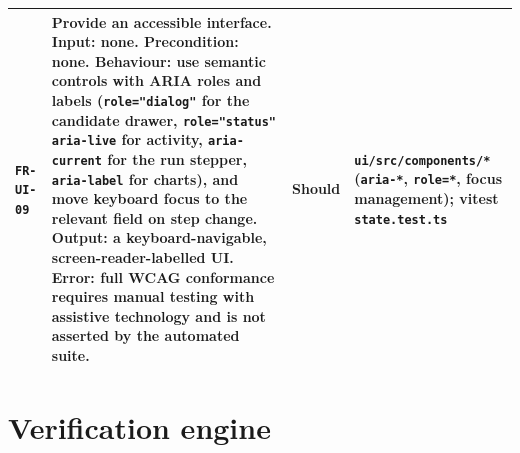 \begin{longtable}{@{}>{\raggedright\arraybackslash}p{}>{\raggedright\arraybackslash}p{}p{}>{\raggedright\arraybackslash}p{}@{}}
\texttt{FR-UI-09} & \textbf{Provide an accessible interface.} Input: none.
Precondition: none. Behaviour: use semantic controls with ARIA roles and labels
(\texttt{role="dialog"} for the candidate drawer, \texttt{role="status"}
\texttt{aria-live} for activity, \texttt{aria-current} for the run stepper,
\texttt{aria-label} for charts), and move keyboard focus to the relevant field on
step change. Output: a keyboard-navigable, screen-reader-labelled UI. Error: full
WCAG conformance requires manual testing with assistive technology and is not
asserted by the automated suite. & Should & \texttt{ui/src/components/*}
(\texttt{aria-*}, \texttt{role=*}, focus management); vitest \texttt{state.test.ts} \\
\bottomrule
\end{longtable}

\section{Verification engine}
\label{sec:fr-ver}

